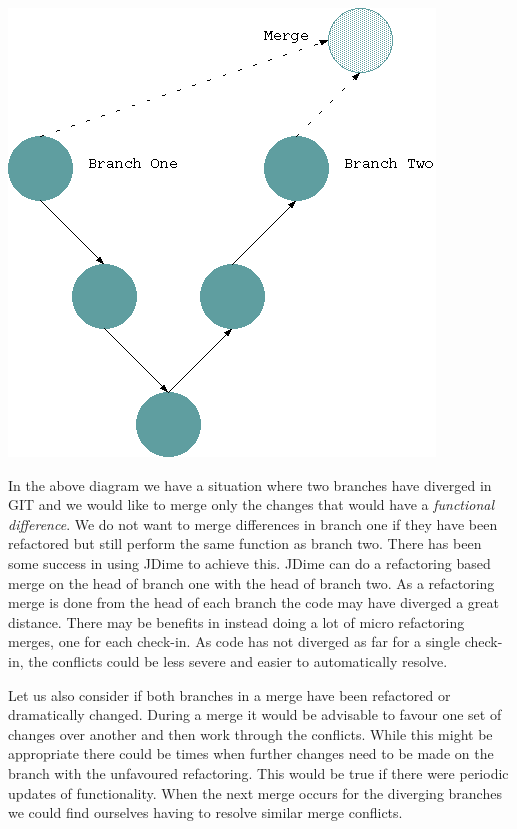 \documentclass[12pt]{CRPITStyle}
\begin{document}
\begin{center}
\includegraphics[scale=0.5]{git-diag}
\end{center}

In the above diagram we have a situation where two branches have diverged in GIT and we would like to merge only the changes that would have a \emph{functional difference}. We do not want to merge differences in branch one if they have been refactored but still perform the same function as branch two.  There has been some success in using JDime to achieve this.  JDime can do a refactoring based merge on the head of branch one with the head of branch two.  As a refactoring merge is done from the head of each branch the code may have diverged a great distance.  There may be benefits in instead doing a lot of micro refactoring merges, one for each check-in. As code has not diverged as far for a single check-in, the conflicts could be less severe and easier to automatically resolve. 

Let us also consider if both branches in a merge have been refactored or dramatically changed. During a merge it would be advisable to favour one set of changes over another and then work through the conflicts. While this might be appropriate there could be times when further changes need to be made on the branch with the unfavoured refactoring. This would be true if there were periodic updates of functionality. When the next merge occurs for the diverging branches we could find ourselves having to resolve similar merge conflicts. 
\end{document}
